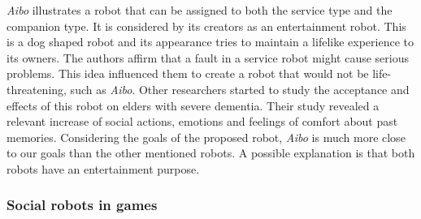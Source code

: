 \emph{Aibo} illustrates a robot that can be assigned to both the service type and the companion type.
It is considered by its creators as an entertainment robot.
This is a dog shaped robot and its appearance tries to maintain a lifelike experience to its owners.
The authors affirm that a fault in a service robot might cause serious problems.
This idea influenced them to create a robot that would not be life-threatening, such as \emph{Aibo}.
Other researchers started to study the acceptance and effects of this robot on elders with severe dementia.
Their study revealed a relevant increase of social actions, emotions and feelings of comfort about past memories.
Considering the goals of the proposed robot, \emph{Aibo} is much more close to our goals than the other mentioned robots.
A possible explanation is that both robots have an entertainment purpose.


\subsubsection{Social robots in games}

